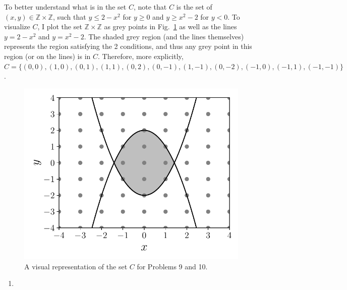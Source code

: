\begin{problem}{9} To better understand what is in the set $C$, note that $C$ is the set of $(x, y) \in \mathbb Z \times \mathbb Z$, such that $y \le 2-x^2$ for $y \ge 0$ and $y \ge x^2-2$ for $y < 0$.  To visualize $C$, I plot the set $\mathbb Z \times \mathbb Z$ as grey points in Fig.~\ref{fig:prob_9} as well as the lines $y = 2-x^2$ and $y = x^2-2$.  The shaded grey region (and the lines themselves) represents the region satisfying the 2 conditions, and thus any grey point in this region (or on the lines) is in $C$.  Therefore, more explicitly, $C = \{(0, 0), (1, 0), (0, 1), (1, 1), (0, 2), (0,-1), (1, -1), (0, -2), (-1, 0), (-1, 1), (-1, -1) \}$.


	\begin{figure}[t]
	\centering
      		 \includegraphics[totalheight=6cm]{chpt5/prob9.pdf}
  			  \caption{A visual representation of the set $C$ for Problems 9 and 10.}
    			   \label{fig:prob_9}
	\end{figure}
\begin{enumerate}

\item 


\end{enumerate}
\end{problem}
